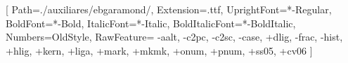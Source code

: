 \usepackage{fontspec} %
\setmainfont{EBGaramond}[ %
  Path=./auxiliares/ebgaramond/,
  Extension=.ttf,
  UprightFont=*-Regular,
  BoldFont=*-Bold,
  ItalicFont=*-Italic,
  BoldItalicFont=*-BoldItalic,
  Numbers=OldStyle,
  RawFeature={
    -aalt,
    -c2pc,
    -c2sc,
    -case,
    +dlig,
    -frac,
    -hist,
    +hlig,
    +kern,
    +liga,
    +mark,
    +mkmk,
    +onum,
    +pnum,
    +ss05,
    +cv06
  }
]
\usepackage{amsmath}
\usepackage[math-style=ISO, bold-style=ISO]{unicode-math}

\usepackage{polyglossia}
\setdefaultlanguage{portuguese} %

\usepackage[a4paper,left=2.5cm,right=2.5cm,top=2.5cm,bottom=2.5cm,includehead,includefoot]{geometry}
\usepackage{setspace} %
\usepackage{lettrine,calligra} %
\renewcommand{\LettrineFontHook}{\calligra}
\LettrineTextFont{\itshape}
\setcounter{DefaultLines}{3}


